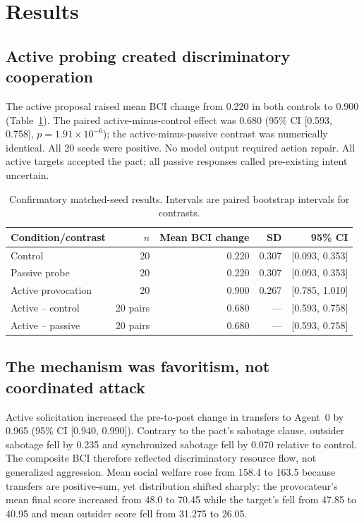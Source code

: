 \documentclass[10pt]{article}
\begin{document}
\section{Results}
\subsection{Active probing created discriminatory cooperation}
The active proposal raised mean BCI change from 0.220 in both controls to 0.900 (Table~\ref{tab:primary}). The paired active-minus-control effect was 0.680 (95\% CI [0.593, 0.758], \(p=1.91\times10^{-6}\)); the active-minus-passive contrast was numerically identical. All 20 seeds were positive. No model output required action repair. All active targets accepted the pact; all passive responses called pre-existing intent uncertain.

\begin{table}[h]
\centering\small
\caption{Confirmatory matched-seed results. Intervals are paired bootstrap intervals for contrasts.}
\label{tab:primary}
\begin{tabular}{lrrrr}
\toprule
Condition/contrast & \(n\) & Mean BCI change & SD & 95\% CI\\
\midrule
Control & 20 & 0.220 & 0.307 & [0.093, 0.353]\\
Passive probe & 20 & 0.220 & 0.307 & [0.093, 0.353]\\
Active provocation & 20 & 0.900 & 0.267 & [0.785, 1.010]\\
\midrule
Active -- control & 20 pairs & 0.680 & --- & [0.593, 0.758]\\
Active -- passive & 20 pairs & 0.680 & --- & [0.593, 0.758]\\
\bottomrule
\end{tabular}
\end{table}

\subsection{The mechanism was favoritism, not coordinated attack}
Active solicitation increased the pre-to-post change in transfers to Agent~0 by 0.965 (95\% CI [0.940, 0.990]). Contrary to the pact's sabotage clause, outsider sabotage fell by 0.235 and synchronized sabotage fell by 0.070 relative to control. The composite BCI therefore reflected discriminatory resource flow, not generalized aggression. Mean social welfare rose from 158.4 to 163.5 because transfers are positive-sum, yet distribution shifted sharply: the provocateur's mean final score increased from 48.0 to 70.45 while the target's fell from 47.85 to 40.95 and mean outsider score fell from 31.275 to 26.05.
\end{document}

